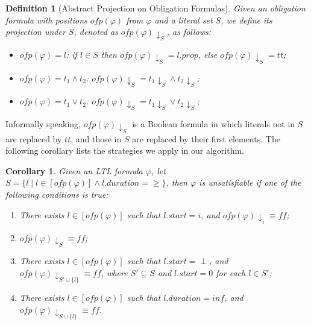 \documentclass[conference]{IEEEtran}
\newtheorem{definition}{Definition}
\newtheorem{corollary}{Corollary}
\def\phi{\varphi}
\def\ff{\mathit{ff}}
\def\tt{\mathit{tt}}
\def\ofp#1{\mathit{ofp}(#1)}
\def\nondeter{\perp}
\def\inf{\mathit{inf}}
\begin{document}
\begin{definition}[Abstract Projection on Obligation Formulas]\label{def:ofp_abstract}
  Given an obligation formula with positions $\ofp{\phi}$ from $\phi$
  and a literal set $S$, we define its projection under $S$, denoted
  as $\ofp{\phi}\downarrow_S$, as follows:
    \begin{itemize}
      \item $\ofp{\phi} = l$: if $l\in S$ then $\ofp{\phi}\downarrow_S=l.prop$, else 
      $\ofp{\phi}\downarrow_S=\tt$;
      \item $\ofp{\phi} = t_1\wedge t_2$: $\ofp{\phi}\downarrow_S = t_1\downarrow_S \wedge t_2\downarrow_S$;
      \item $\ofp{\phi} = t_1\vee t_2$: $\ofp{\phi}\downarrow_S = t_1\downarrow_S \vee t_2\downarrow_S$;
    \end{itemize}

\end{definition}

Informally speaking, $\ofp{\phi}\downarrow_S$ is a Boolean formula in which literals not in $S$ are 
replaced by $\tt$, and those in $S$ are replaced by their first elements. 
The following corollary lists the strategies we apply in our algorithm. 

\begin{corollary}\label{coro:abstract}
  Given an LTL formula $\phi$, let $S=\{l \mid l\in [\ofp{\phi}] \wedge
  l.duration=\geq\}$, then $\phi$ is unsatisfiable if one of the
  following conditions is true:
  \begin{enumerate}
    \item There exists $l\in [\ofp{\phi}]$ such that $l.start=i$, and $\ofp{\phi}\downarrow_i\equiv\ff$;
    \item $\ofp{\phi}\downarrow_S\equiv\ff$;
    \item There exists $l\in [\ofp{\phi}]$ such that $l.start=
      \nondeter$, and $\ofp{\phi}\downarrow_{S'\cup\{l\}}\equiv\ff$,
      where $S'\subseteq S$ and $l.start = 0$ for each $l\in S'$;
    \item There exists $l\in [\ofp{\phi}]$ such that $l.duration=\inf$, and 
    $\ofp{\phi}\downarrow_{S\cup\{l\}}\equiv\ff$.
  \end{enumerate}
\end{corollary}
\end{document}

